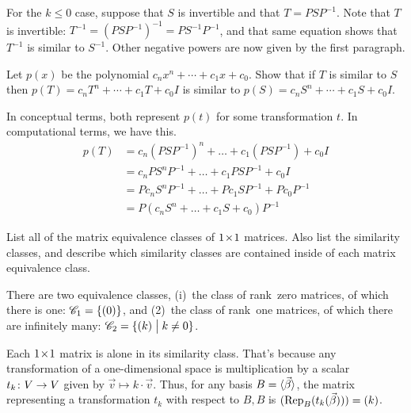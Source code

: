 \begin{exercises}
\begin{answer}
      For the $k\leq 0$ case, 
      suppose that \( S \) is invertible and that \( T=PSP^{-1} \).
      Note that \( T \) is invertible:
      \( T^{-1}=(PSP^{-1})^{-1}=PS^{-1}P^{-1} \),
      and that same equation shows that 
      \( T^{-1} \) is similar to \( S^{-1} \).
      Other negative powers are now given by the first paragraph.  
    \end{answer}
  \recommended \item
    Let \( p(x) \) be the polynomial \( c_nx^n+\cdots+c_1x+c_0 \).
    Show that if \( T \) is similar to \( S \) then
    \( p(T)=c_nT^n+\cdots+c_1T+c_0I \) is similar to
    \( p(S)=c_nS^n+\cdots+c_1S+c_0I \).
    \begin{answer}
       In conceptual terms, both represent \( p(t) \) for some
       transformation \( t \).
       In computational terms, we have this.
       \begin{align*}
          p(T)
          &=c_n(PSP^{-1})^n+\dots+c_1(PSP^{-1})+c_0I   \\
          &=c_nPS^nP^{-1}+\dots+c_1PSP^{-1}+c_0I   \\
          &=Pc_nS^nP^{-1}+\dots+Pc_1SP^{-1}+Pc_0P^{-1}   \\
          &=P(c_nS^n+\dots+c_1S+c_0)P^{-1}
       \end{align*}  
     \end{answer}
  \item 
    List all of the matrix equivalence classes of \( \nbyn{1} \) matrices.
    Also list the similarity classes, and describe which similarity classes are
    contained inside of each matrix equivalence class.
    \begin{answer}
      There are two equivalence classes, (i)~the class of rank~zero matrices, 
      of which there is one:
      $\mathscr{C}_1=\set{(0)}$,
      and (2)~the class of rank~one matrices,
      of which there are infinitely many: 
      \( \mathscr{C}_2=\set{(k)\suchthat k\neq0} \).

      Each \( \nbyn{1} \) matrix is alone in its similarity class.
      That's because any transformation of a one-dimensional space
      is multiplication by a scalar $\map{t_k}{V}{V}$ given by
      $\vec{v}\mapsto k\cdot\vec{v}$. 
      Thus, for any basis \( B=\sequence{\vec{\beta}} \),
      the matrix representing a transformation \( t_k \) 
      with respect to \( B,B \) is
      \( (\rep{t_k(\vec{\beta})}{B})=(k) \). 
      

\end{answer}
\end{exercises}
